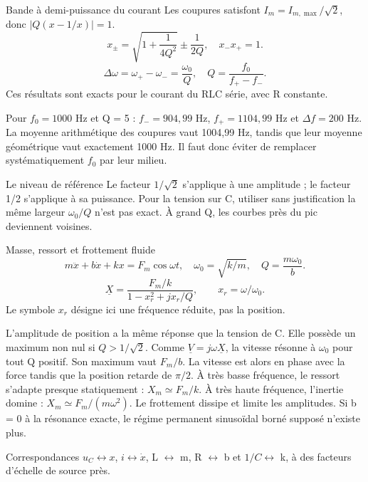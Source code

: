 \begin{loi}{Bande à demi-puissance du courant}
Les coupures satisfont $I_m=I_{m,\max}/\sqrt2$, donc $|Q(x-1/x)|=1$.\[x_\pm=\sqrt{1+\frac1{4Q^2}}\pm\frac1{2Q},\quad x_-x_+=1.\]\[\Delta\omega=\omega_+-\omega_-=\frac{\omega_0}{Q},\quad Q=\frac{f_0}{f_+-f_-}.\]Ces résultats sont exacts pour le courant du RLC série, avec R constante.
\end{loi}
Pour $f_0=1000$ Hz et Q = 5 : $f_-=904{,}99$ Hz, $f_+=1104{,}99$ Hz et $\Delta f=200$ Hz. La moyenne arithmétique des coupures vaut 1004,99 Hz, tandis que leur moyenne géométrique vaut exactement 1000 Hz. Il faut donc éviter de remplacer systématiquement $f_0$ par leur milieu.
\begin{piege}{Le niveau de référence}
Le facteur $1/\sqrt2$ s’applique à une amplitude ; le facteur 1/2 s’applique à sa puissance. Pour la tension sur C, utiliser sans justification la même largeur $\omega_0/Q$ n’est pas exact. À grand Q, les courbes près du pic deviennent voisines.
\end{piege}


\begin{loi}{Masse, ressort et frottement fluide}
\[m\ddot x+b\dot x+kx=F_m\cos\omega t,\quad \omega_0=\sqrt{k/m},\quad Q=\frac{m\omega_0}{b}.\]\[\underline X=\frac{F_m/k}{1-x_r^2+jx_r/Q},\qquad x_r=\omega/\omega_0.\]Le symbole $x_r$ désigne ici une fréquence réduite, pas la position.
\end{loi}
L’amplitude de position a la même réponse que la tension de C. Elle possède un maximum non nul si $Q>1/\sqrt2$. Comme $\underline V=j\omega\underline X$, la vitesse résonne à $\omega_0$ pour tout Q positif. Son maximum vaut $F_m/b$. La vitesse est alors en phase avec la force tandis que la position retarde de $\pi/2$.
À très basse fréquence, le ressort s’adapte presque statiquement : $X_m\simeq F_m/k$. À très haute fréquence, l’inertie domine : $X_m\simeq F_m/(m\omega^2)$. Le frottement dissipe et limite les amplitudes. Si b = 0 à la résonance exacte, le régime permanent sinusoïdal borné supposé n’existe plus.
\begin{docu}{Correspondances}
$u_C\leftrightarrow x$, $i\leftrightarrow\dot x$, L $\leftrightarrow$ m, R $\leftrightarrow$ b et $1/C\leftrightarrow$ k, à des facteurs d’échelle de source près.
\end{docu}


